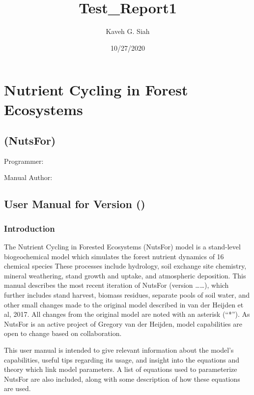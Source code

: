 \documentclass[
]{article}
\title{Test\_Report1}
\author{Kaveh G. Siah}
\date{10/27/2020}
\begin{document}
\maketitle

\hypertarget{nutrient-cycling-in-forest-ecosystems}{%
\section{Nutrient Cycling in Forest
Ecosystems}\label{nutrient-cycling-in-forest-ecosystems}}

\hypertarget{nutsfor}{%
\subsection{(NutsFor)}\label{nutsfor}}

Programmer:

Manual Author:

\hypertarget{user-manual-for-version}{%
\subsection{User Manual for Version ()}\label{user-manual-for-version}}

\hypertarget{introduction}{%
\subsubsection{Introduction}\label{introduction}}

The Nutrient Cycling in Forested Ecosystems (NutsFor) model is a
stand-level biogeochemical model which simulates the forest nutrient
dynamics of 16 chemical species These processes include hydrology, soil
exchange site chemistry, mineral weathering, stand growth and uptake,
and atmospheric deposition. This manual describes the most recent
iteration of NutsFor (version \ldots\ldots), which further includes
stand harvest, biomass residues, separate pools of soil water, and other
small changes made to the original model described in van der Heijden et
al, 2017. All changes from the original model are noted with an asterisk
(``*''). As NutsFor is an active project of Gregory van der Heijden,
model capabilities are open to change based on collaboration.

This user manual is intended to give relevant information about the
model's capabilities, useful tips regarding its usage, and insight into
the equations and theory which link model parameters. A list of
equations used to parameterize NutsFor are also included, along with
some description of how these equations are used.
\end{document}
